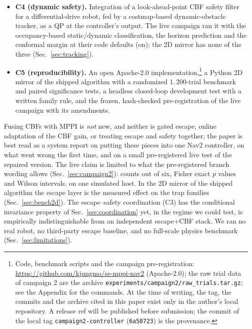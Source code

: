 \documentclass[journal]{IEEEtran}
\begin{document}
\begin{itemize}
  the tracked dynamic obstacles, assumes the barrier inequality holds
  between samples, assumes a Carath\'eodory closed-loop solution along which $h_j$ is absolutely continuous,
  and requires a slack-free QP. In our 2D benchmark the
  schedule is empirically indistinguishable from an independent
  escape+CBF stack (Sec.~\ref{sec:evsf}), and the live campaign does not
  test it: its pockets contain no moving body (Sec.~\ref{sec:c2results}
  reports the phantom obstacles and forced stops that occurred
  nevertheless, which were not a designed test of the coordination).
\item \textbf{C4 (dynamic safety).} Integration of a look-ahead-point CBF
  safety filter for a differential-drive robot, fed by a costmap-based
  dynamic-obstacle tracker, as a QP at the controller's output. The live
  campaign ran it with the occupancy-based static/dynamic classification, the
  horizon prediction and the conformal margin at their code defaults (on); the
  2D mirror has none of the three (Sec.~\ref{sec:tracking}).
\item \textbf{C5 (reproducibility).} An open Apache-2.0
  implementation,\footnote{Code, benchmark scripts and the campaign
  pre-registration: \url{https://github.com/kjungmo/se-mppi-nav2}
  (Apache-2.0); the raw trial data of campaign 2 are the archive
  \texttt{experiments/campaign2/raw\_trials.tar.gz}; see the Appendix for
  the commands. At the time of writing, the tag, the commits and the archive
  cited in this paper exist only in the author's local repository. A release
  ref will be published before submission; the commit of the local tag
  \texttt{campaign2-controller} (\texttt{6a50723}) is the provenance.} a Python 2D mirror of the shipped
  algorithm with a randomized $1{,}200$-trial benchmark and paired
  significance tests, a headless closed-loop development test with a
  written family rule, and the frozen, hash-checked pre-registration of
  the live campaign with its amendments.
\end{itemize}

Fusing CBFs with MPPI is \emph{not} new, and neither is gated
escape, online adaptation of the CBF gain, or treating escape and safety
together; the paper is best read as a system report on putting these
pieces into one Nav2 controller, on what went wrong the first time, and on
a small pre-registered live test of the repaired version. The live claim
is limited to what the pre-registered branch wording allows
(Sec.~\ref{sec:campaign2}): counts out of six, Fisher exact $p$ values and
Wilson intervals, on one simulated host. In the 2D mirror of the shipped
algorithm the escape layer is the measured effect on the trap families
(Sec.~\ref{sec:bench2d}). The escape--safety coordination (C3) has the
conditional invariance property of Sec.~\ref{sec:coordination} yet, in the
regime we could test, is empirically indistinguishable from an independent
escape+CBF stack. We ran no real robot, no
third-party escape baseline, and no full-scale physics benchmark
(Sec.~\ref{sec:limitations}).
\end{document}
